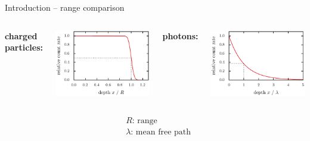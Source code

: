 \documentclass[11pt,xcolor=dvipsnames,professionalfonts]{beamer}
\begin{document}
\begin{frame}{Introduction -- range comparison}
	
	\begin{columns}
		\centering
		\hspace{1cm}\textbf{charged particles:}
		
		\vspace{0.5cm}
		
		\includegraphics[width=1.0\textwidth]{./figures/range.pdf}
		
		
		\centering
		\hspace{1cm}\textbf{photons:}
		
		\vspace{0.5cm}
		
		\includegraphics[width=1.0\textwidth]{./figures/lambert_beer_exp.pdf}
	\end{columns}
	
	\begin{align*}
		&R\text{: range}\\ 
		&\lambda\text{: mean free path}
	\end{align*}
\end{frame}
\end{document}
